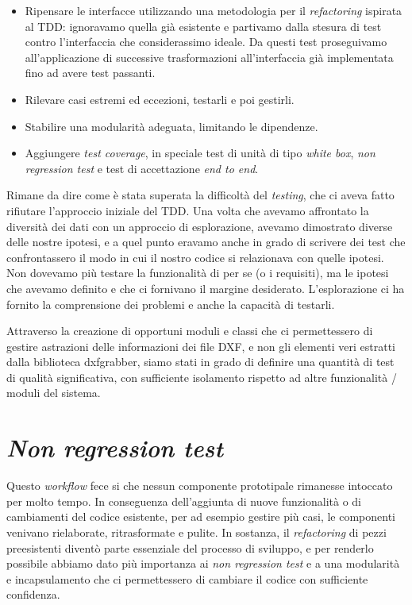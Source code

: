 \documentclass[12pt]{report}
\begin{document}
\begin{itemize}
	\item Ripensare le interfacce utilizzando una metodologia per il
\textit{refactoring} ispirata al TDD: ignoravamo quella già esistente
e partivamo dalla stesura di test contro l'interfaccia che considerassimo
ideale. Da questi test proseguivamo all'applicazione di successive
trasformazioni all'interfaccia già implementata fino ad avere test passanti. 
	\item Rilevare casi estremi ed eccezioni, testarli e poi gestirli.
	\item Stabilire una modularità adeguata, limitando le dipendenze.
	\item Aggiungere \textit{test coverage}, in speciale test di unità di
tipo \textit{white box}, \textit{non regression test} e test di
accettazione \textit{end to end}.
\end{itemize}

Rimane da dire come è stata superata la difficoltà del \textit{testing}, che
ci aveva fatto rifiutare l'approccio iniziale del TDD. Una volta che avevamo
affrontato la diversità dei dati con un approccio di esplorazione, avevamo
dimostrato diverse delle nostre ipotesi, e a quel punto eravamo anche in grado
di scrivere dei test che confrontassero il modo in cui il nostro codice si
relazionava con quelle ipotesi. Non dovevamo più testare la funzionalità di
per se (o i requisiti), ma le ipotesi che avevamo definito e che ci fornivano
il margine desiderato. L'esplorazione ci ha fornito la comprensione dei
problemi e anche la capacità di testarli.

Attraverso la creazione di opportuni moduli e classi che ci permettessero di
gestire astrazioni delle informazioni dei file DXF, e non gli elementi veri
estratti dalla biblioteca dxfgrabber, siamo stati in grado di definire una
quantità di test di qualità significativa, con sufficiente isolamento rispetto
ad altre funzionalità / moduli del sistema.

\section{\textit{Non regression test}}

Questo \textit{workflow} fece si che nessun componente prototipale
rimanesse intoccato per molto tempo. In conseguenza dell'aggiunta di
nuove funzionalità o di cambiamenti del codice esistente, per ad
esempio gestire più casi, le componenti venivano rielaborate,
ritrasformate e pulite. In sostanza, il \textit{refactoring} di pezzi
preesistenti diventò parte essenziale del processo di sviluppo, e per
renderlo possibile abbiamo dato più importanza ai \textit{non
regression test} e a una modularità e incapsulamento che ci permettessero di
cambiare il codice con sufficiente confidenza. 
\end{document}
